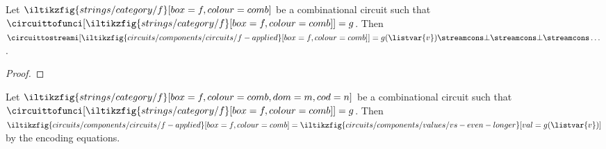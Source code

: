 \begin{lemma}\label{lem:interpretation-combinational}
    Let \(\iltikzfig{strings/category/f}[box=f,colour=comb]\) be a combinational
    circuit such that \(
    \circuittofunci[\iltikzfig{strings/category/f}[box=f,colour=comb]]
    =
    g\).
    Then \(\circuittostreami[
        \iltikzfig{circuits/components/circuits/f-applied}[box=f,colour=comb]
    ]
    =
    g(\listvar{v}) \streamcons \bot \streamcons \bot \streamcons \dots\).
\end{lemma}
\begin{proof}

\end{proof}

\begin{lemma}\label{lem:combinational-circuit-inputs}
    Let \(\iltikzfig{strings/category/f}[box=f,colour=comb,dom=m,cod=n]\) be a
    combinational circuit such that \(
    \circuittofunci[\iltikzfig{strings/category/f}[box=f,colour=comb]]
    =
    g
    \).
    Then \(
    \iltikzfig{circuits/components/circuits/f-applied}[box=f,colour=comb]
    =
    \iltikzfig{circuits/components/values/vs-even-longer}[val=g(\listvar{v})]
    \) by the encoding equations.
\end{lemma}
